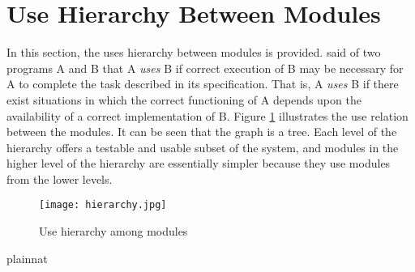 \documentclass[12pt, titlepage]{article}
\begin{document}
\section{Use Hierarchy Between Modules} \label{SecUse}


In this section, the uses hierarchy between modules is provided. \cite{Parnas1978} said of two programs A and B that A {\em uses} B if correct execution of B may be necessary for A to complete the task described in its specification. That is, A {\em uses} B if there exist situations in which
the correct functioning of A depends upon the availability of a correct implementation of B.  Figure \ref{FigUH} illustrates the use relation between the modules. It can be seen that the graph is a tree. Each level of the hierarchy offers a testable and usable subset of the system, and modules in the higher level of the hierarchy are essentially simpler because they use modules from the lower levels.



\begin{figure}[H]
\centering
\texttt{[image: hierarchy.jpg]}
\caption{Use hierarchy among modules}
\label{FigUH}
\end{figure}


 {plainnat}


\newpage{}
\end{document}
